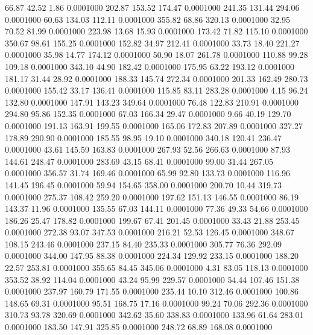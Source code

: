  66.87   42.52    1.86   0.0001000
 202.87  153.52  174.47   0.0001000
 241.35  131.44  294.06   0.0001000
  60.63  134.03  112.11   0.0001000
 355.82   68.86  320.13   0.0001000
  32.95   70.52   81.99   0.0001000
 223.98   13.68   15.93   0.0001000
 173.42   71.82  115.10   0.0001000
 350.67   98.61  155.25   0.0001000
 152.82   34.97  212.41   0.0001000
  33.73   18.40  221.27   0.0001000
  35.98   14.77  174.12   0.0001000
  50.90   18.07  261.78   0.0001000
 110.88   99.28  109.18   0.0001000
 343.10   44.90  182.42   0.0001000
 175.95   63.22  193.12   0.0001000
 181.17   31.44   28.92   0.0001000
 188.33  145.74  272.34   0.0001000
 201.33  162.49  280.73   0.0001000
 155.42   33.17  136.41   0.0001000
 115.85   83.11  283.28   0.0001000
   4.15   96.24  132.80   0.0001000
 147.91  143.23  349.64   0.0001000
  76.48  122.83  210.91   0.0001000
 294.80   95.86  152.35   0.0001000
  67.03  166.34   29.47   0.0001000
   9.66   40.19  129.70   0.0001000
 191.13  163.91  199.55   0.0001000
 165.06  172.83  207.89   0.0001000
 327.27  178.89  290.90   0.0001000
 185.55   98.95   19.10   0.0001000
 340.18  120.41  236.47   0.0001000
  43.61  145.59  163.83   0.0001000
 267.93   52.56  266.63   0.0001000
  87.93  144.61  248.47   0.0001000
 283.69   43.15   68.41   0.0001000
  99.00   31.44  267.05   0.0001000
 356.57   31.74  169.46   0.0001000
  65.99   92.80  133.73   0.0001000
 116.96  141.45  196.45   0.0001000
  59.94  154.65  358.00   0.0001000
 200.70   10.44  319.73   0.0001000
 275.37  108.42  259.20   0.0001000
 197.62  151.13  146.55   0.0001000
  86.19  143.37   11.96   0.0001000
 135.55   67.03  144.11   0.0001000
  77.36   49.33   54.66   0.0001000
 186.26   25.47  178.82   0.0001000
 199.67   67.41  201.45   0.0001000
  33.43   21.88  253.45   0.0001000
 272.38   93.07  347.53   0.0001000
 216.21   52.53  126.45   0.0001000
 348.67  108.15  243.46   0.0001000
 237.15   84.40  235.33   0.0001000
 305.77   76.36  292.09   0.0001000
 344.00  147.95   88.38   0.0001000
 224.34  129.92  233.15   0.0001000
 188.20   22.57  253.81   0.0001000
 355.65   84.45  345.06   0.0001000
   4.31   83.05  118.13   0.0001000
 353.52   38.92  114.04   0.0001000
  43.24   95.99  229.57   0.0001000
  54.44  107.46  151.38   0.0001000
 237.97  160.79  171.55   0.0001000
 235.44   10.10  312.46   0.0001000
 100.86  148.65   69.31   0.0001000
  95.51  168.75   17.16   0.0001000
  99.24   70.06  292.36   0.0001000
 310.73   93.78  320.69   0.0001000
 342.62   35.60  338.83   0.0001000
 133.96   61.64  283.01   0.0001000
 183.50  147.91  325.85   0.0001000
 248.72   68.89  168.08   0.0001000
